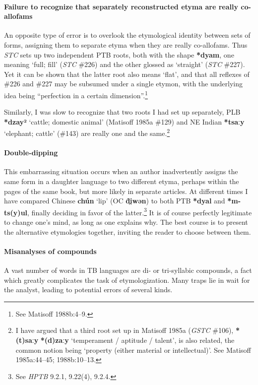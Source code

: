 \paragraph{Failure to recognize that separately reconstructed etyma are really co-allofams}

An opposite type of error is to overlook the etymological identity between sets
of forms, assigning them to separate etyma when they are really co-allofams.
Thus \textit{STC} sets up two independent PTB roots, both with the shape \textbf{*dyam}, one
meaning ‘full; fill’ (\textit{STC} \#226) and the other glossed as ‘straight’ (\textit{STC} \#227).
Yet it can be shown that the latter root also means ‘flat’, and that all
reflexes of \#226 and \#227 may be subsumed under a single etymon, with the
underlying idea being “perfection in a certain dimension”.\footnote{See Matisoff
1988b:4–9.}


Similarly, I was slow to recognize that two roots I had set up separately,
PLB \textbf{*dzay²} ‘cattle; domestic animal’ (Matisoff 1985a \#129)
and NE Indian \textbf{*tsaːy} ‘elephant;
cattle’ (\#143) are really one and the same.\footnote{I have argued that a
third root set up in Matisoff 1985a (\textit{GSTC} \#106), \textbf{*(t)saːy}  \textbf{*(d)zaːy} ‘temperament / aptitude / talent’, is also related, the common notion being ‘property (either material or
intellectual)’. See Matisoff 1985a:44–45; 1988b:10–13.}

\paragraph{Double-dipping}
This embarrassing situation occurs when an author inadvertently assigns the same
form in a daughter language to two different etyma, perhaps within the pages of
the same book, but more likely in separate articles. At different times I have
compared Chinese \textbf{chún}  ‘lip’ (OC \textbf{d̑i̯wən}) to both PTB \textbf{*dyal}
and \textbf{*m-ts(y)ul}, finally deciding in favor of the latter.\footnote{See \textit{HPTB}
9.2.1, 9.22(4), 9.2.4.}  It
is of course perfectly legitimate to change one’s mind, as long as one explains
why. The best course is to present the alternative etymologies together,
inviting the reader to choose between them.

\paragraph{Misanalyses of compounds}
A vast number of words in TB languages are di- or tri-syllabic compounds, a fact
which greatly complicates the task of etymologization. Many traps lie in wait
for the analyst, leading to potential errors of several kinds.

